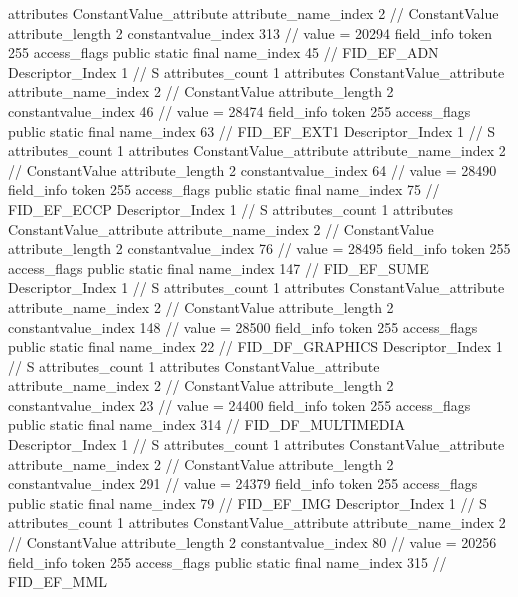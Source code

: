 {{{{{				attributes {
				ConstantValue_attribute {
					attribute_name_index	2		// ConstantValue
					attribute_length	2
					constantvalue_index	313		// value = 20294
				}
				}
			}
			field_info {
				token	255
				access_flags	public static final
				name_index	45		// FID_EF_ADN
				Descriptor_Index	1		// S
				attributes_count	1
				attributes {
				ConstantValue_attribute {
					attribute_name_index	2		// ConstantValue
					attribute_length	2
					constantvalue_index	46		// value = 28474
				}
				}
			}
			field_info {
				token	255
				access_flags	public static final
				name_index	63		// FID_EF_EXT1
				Descriptor_Index	1		// S
				attributes_count	1
				attributes {
				ConstantValue_attribute {
					attribute_name_index	2		// ConstantValue
					attribute_length	2
					constantvalue_index	64		// value = 28490
				}
				}
			}
			field_info {
				token	255
				access_flags	public static final
				name_index	75		// FID_EF_ECCP
				Descriptor_Index	1		// S
				attributes_count	1
				attributes {
				ConstantValue_attribute {
					attribute_name_index	2		// ConstantValue
					attribute_length	2
					constantvalue_index	76		// value = 28495
				}
				}
			}
			field_info {
				token	255
				access_flags	public static final
				name_index	147		// FID_EF_SUME
				Descriptor_Index	1		// S
				attributes_count	1
				attributes {
				ConstantValue_attribute {
					attribute_name_index	2		// ConstantValue
					attribute_length	2
					constantvalue_index	148		// value = 28500
				}
				}
			}
			field_info {
				token	255
				access_flags	public static final
				name_index	22		// FID_DF_GRAPHICS
				Descriptor_Index	1		// S
				attributes_count	1
				attributes {
				ConstantValue_attribute {
					attribute_name_index	2		// ConstantValue
					attribute_length	2
					constantvalue_index	23		// value = 24400
				}
				}
			}
			field_info {
				token	255
				access_flags	public static final
				name_index	314		// FID_DF_MULTIMEDIA
				Descriptor_Index	1		// S
				attributes_count	1
				attributes {
				ConstantValue_attribute {
					attribute_name_index	2		// ConstantValue
					attribute_length	2
					constantvalue_index	291		// value = 24379
				}
				}
			}
			field_info {
				token	255
				access_flags	public static final
				name_index	79		// FID_EF_IMG
				Descriptor_Index	1		// S
				attributes_count	1
				attributes {
				ConstantValue_attribute {
					attribute_name_index	2		// ConstantValue
					attribute_length	2
					constantvalue_index	80		// value = 20256
				}
				}
			}
			field_info {
				token	255
				access_flags	public static final
				name_index	315		// FID_EF_MML
}}}}}
